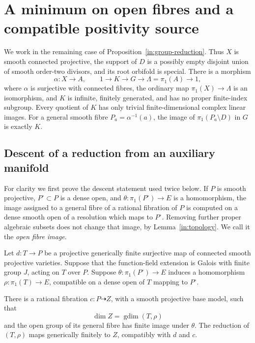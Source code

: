 \section{A minimum on open fibres and a compatible positivity source}
\label{in:minimality}

We work in the remaining case of Proposition~\ref{in:group-reduction}.
Thus $X$ is smooth connected projective, the support of $D$ is a
possibly empty disjoint union of smooth order-two divisors, and its
root orbifold is special.  There is a morphism
\begin{equation}\label{in:reduced-sequence}
 \alpha:X\longrightarrow A,
 \qquad
 1\longrightarrow K\longrightarrow G\longrightarrow
 \Lambda=\pi_1(A)\longrightarrow1,
\end{equation}
where $\alpha$ is surjective with connected fibres, the ordinary map
$\pi_1(X)\to\Lambda$ is an isomorphism, and $K$ is infinite, finitely
generated, and has no proper finite-index subgroup.  Every quotient of
$K$ has only trivial finite-dimensional complex linear images.  For a
general smooth fibre $P_a=\alpha^{-1}(a)$, the image of
$\pi_1(P_a\setminus D)$ in $G$ is exactly $K$.

\subsection{Descent of a reduction from an auxiliary manifold}

For clarity we first prove the descent statement used twice below.  If
$P$ is smooth projective, $P^\circ\subset P$ is a dense open, and
$\theta:\pi_1(P^\circ)\to E$ is a homomorphism, the image assigned
to a general fibre of a rational fibration of $P$ is computed on a
dense smooth open of a resolution which maps to $P^\circ$.  Removing
further proper algebraic subsets does not change that image, by
Lemma~\ref{in:topology}.  We call it the \emph{open fibre image}.

\begin{lemma}\label{in:descended-reduction}
Let $d:T\to P$ be a projective generically finite surjective map of
connected smooth projective varieties.  Suppose that the function-field
extension is Galois with finite group $J$, acting on $T$ over $P$.
Suppose $\theta:\pi_1(P^\circ)\to E$ induces a homomorphism
$\rho:\pi_1(T)\to E$, compatible on a dense open of $T$ mapping
to $P^\circ$.

There is a rational fibration $c:P\dashrightarrow Z$, with a smooth
projective base model, such that
\[
 \dim Z=\operatorname{gdim}(T,\rho)
\]
and the open group of its general fibre has finite image under
$\theta$.  The reduction of $(T,\rho)$ maps generically finitely to
$Z$, compatibly with $d$ and $c$.
\end{lemma}

